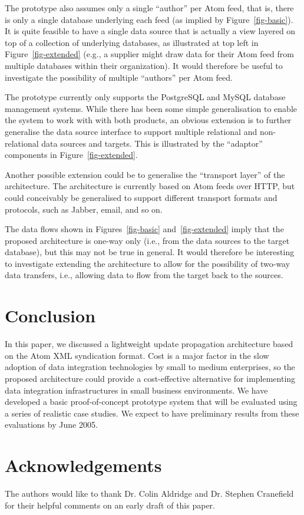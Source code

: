 \documentclass{CRPITStyle}
\begin{document}
The prototype also assumes only a single ``author'' per Atom feed, that
is, there is only a single database underlying each feed (as implied by
Figure~\ref{fig-basic}). It is quite feasible to have a single data
source that is actually a view layered on top of a collection of
underlying databases, as illustrated at top left in
Figure~\ref{fig-extended} (e.g., a supplier might draw data for their
Atom feed from multiple databases within their organization). It would
therefore be useful to investigate the possibility of multiple
``authors'' per Atom feed.

The prototype currently only supports the PostgreSQL and MySQL database
management systems. While there has been some simple generalisation to
enable the system to work with with both products, an obvious extension
is to further generalise the data source interface to support multiple
relational and non-relational data sources and targets. This is
illustrated by the ``adaptor'' components in Figure~\ref{fig-extended}.

Another possible extension could be to generalise the ``transport
layer'' of the architecture. The architecture is currently based on Atom
feeds over HTTP, but could conceivably be generalised to support
different transport formats and protocols, such as Jabber, email, and so
on.

The data flows shown in Figures~\ref{fig-basic} and~\ref{fig-extended}
imply that the proposed architecture is one-way only (i.e., from the
data sources to the target database), but this may not be true in
general. It would therefore be interesting to investigate extending the
architecture to allow for the possibility of two-way data transfers,
i.e., allowing data to flow from the target back to the sources.


\section{Conclusion}
\label{sec-conclusion}

In this paper, we discussed a lightweight update propagation
architecture based on the Atom XML syndication format. Cost is a major
factor in the slow adoption of data integration technologies by small to
medium enterprises, so the proposed architecture could provide a
cost-effective alternative for implementing data integration
infrastructures in small business environments. We have developed a
basic proof-of-concept prototype system that will be evaluated using a
series of realistic case studies. We expect to have preliminary results
from these evaluations by June 2005.


\section*{Acknowledgements}
\label{sec-acknowledgements}

The authors would like to thank Dr. Colin Aldridge and Dr. Stephen
Cranefield for their helpful comments on an early draft of this paper.




\end{document}

